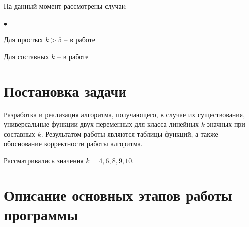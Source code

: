 \documentclass[oneside,final,14pt]{extreport}
\newenvironment{compactlist}{
    \begin{list}{{$\bullet$}}{
      \setlength\partopsep{0pt}
      \setlength\parskip{0pt}
      \setlength\parsep{0pt}
      \setlength\topsep{0pt}
      \setlength\itemsep{0pt}
} }{

 \end{list} 
}
\begin{document}
На данный момент рассмотрены случаи:
\begin{compactlist}
\item Для простых \(k > 5\) -- в работе \cite{k_lin} 
\item Для составных \(k\) -- в работе \cite{k_not_prime}
\end{compactlist}

%




  \chapter*{Постановка задачи}
  
Разработка и реализация алгоритма, получающего, в случае их существования, универсальные функции 
двух переменных для класса линейных \(k\)-значных при составных \(k\). Результатом работы являются таблицы 
функций, а также обоснование корректности работы алгоритма.
  
Рассматривались значения \(k = 4, 6, 8, 9, 10\).

\chapter*{Описание основных этапов работы программы}
\end{document}

